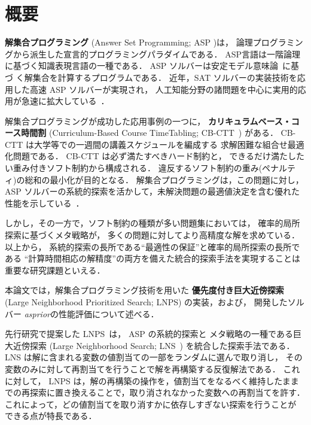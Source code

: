 \chapter*{概要}

\textbf{解集合プログラミング}
(Answer Set Programming; ASP
\cite{%
  baral03:cambridge,%
  DBLP:conf/iclp/GelfondL88,%
  DBLP:journals/amai/Niemela99})は，
論理プログラミングから派生した宣言的プログラミングパラダイムである．
ASP言語は一階論理に基づく知識表現言語の一種である．
ASP ソルバーは安定モデル意味論~\cite{DBLP:conf/iclp/GelfondL88}に基づ
く解集合を計算するプログラムである．
近年，SAT ソルバーの実装技術を応用した高速 ASP ソルバーが実現され，
人工知能分野の諸問題を中心に実用的応用が急速に拡大している~\cite{ergele16a}．

解集合プログラミングが成功した応用事例の一つに，
\textbf{カリキュラムベース・コース時間割}
(Curriculum-Based Course TimeTabling; CB-CTT~\cite{DBLP:journals/anor/BonuttiCGS12})
がある．
CB-CTT は大学等での一週間の講義スケジュールを編成する
求解困難な組合せ最適化問題である．
CB-CTT は必ず満たすべきハード制約と，
できるだけ満たしたい重み付きソフト制約から構成される．
違反するソフト制約の重み(ペナルティ)の総和の最小化が目的となる．
解集合プログラミングは，この問題に対し，
ASP ソルバーの系統的探索を活かして，未解決問題の最適値決定を含む優れた
性能を示している~\cite{anor/Banbara2019}．

しかし，その一方で，ソフト制約の種類が多い問題集においては，
確率的局所探索に基づくメタ戦略が，
多くの問題に対してより高精度な解を求めている．
以上から，
系統的探索の長所である``最適性の保証''と確率的局所探索の長所である
``計算時間相応の解精度''の両方を備えた統合的探索手法を実現することは
重要な研究課題といえる．

本論文では，解集合プログラミング技術を用いた
\textbf{優先度付き巨大近傍探索}
(Large Neighborhood Prioritized Search; LNPS)
の実装，および，
開発したソルバー \textit{asprior}の性能評価について述べる．

先行研究で提案した LNPS~\cite{jsai2021:kutaba}は，
ASP の系統的探索と
メタ戦略の一種である巨大近傍探索
(Large Neighborhood Search; LNS~\cite{Pisinger10})
を統合した探索手法である．
%
LNS は解に含まれる変数の値割当ての一部をランダムに選んで取り消し，
その変数のみに対して再割当てを行うことで解を再構築する反復解法である．
これに対して，
LNPS は，解の再構築の操作を，値割当てをなるべく維持したまま
での再探索に置き換えることで，取り消されなかった変数への再割当てを許す．
これによって，どの値割当てを取り消すかに依存しすぎない探索を行うことが
できる点が特長である．

